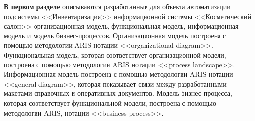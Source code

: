 







\textbf{В первом разделе} описываются разработанные для объекта автоматизации подсистемы <<Инвентаризация>> информационной системы <<Косметический салон>>
организационная модель, функциональная модель, информационная модель и модель бизнес-процессов.
Организационная модель построена с помощью методологии ARIS нотации <<organizational diagram>>.
Функциональная модель, которая соответствует организационной модели, построена с помощью методологии ARIS нотации <<process landscape>>.
Информационная модель построена с помощью методологии ARIS нотации <<general diagram>>, которая показывает связи
между разработанными макетами справочных и оперативных документов.
Модель бизнес-процесса, которая соответствует функциональной модели, построена с помощью методологии ARIS, нотации <<business process>>. 

